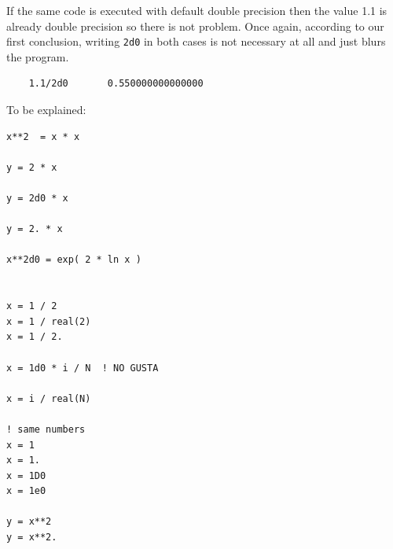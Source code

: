 
If the same code is executed with default double precision then the value 1.1 is already double precision so there is not problem. Once again, according to our first conclusion, writing \texttt{2d0} in both cases is not necessary at all and just blurs the program.

\begin{verbatim}
    1.1/2d0       0.550000000000000
\end{verbatim}





To be explained:

\begin{verbatim} 
x**2  = x * x 

y = 2 * x 

y = 2d0 * x 

y = 2. * x 

x**2d0 = exp( 2 * ln x ) 


x = 1 / 2
x = 1 / real(2) 
x = 1 / 2. 

x = 1d0 * i / N  ! NO GUSTA 

x = i / real(N) 

! same numbers 
x = 1 
x = 1. 
x = 1D0 
x = 1e0 

y = x**2
y = x**2.

\end{verbatim} 






